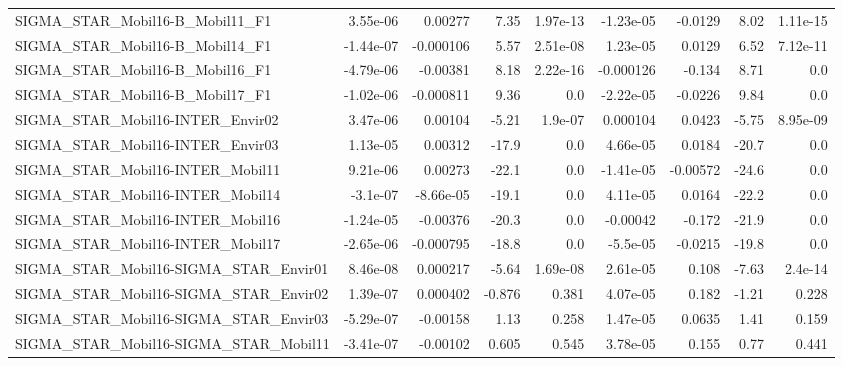 \begin{tabular}{lrrrrrrrr}
SIGMA\_STAR\_Mobil16-B\_Mobil11\_F1           &    3.55e-06 &      0.00277 &    7.35 & 1.97e-13 &  -1.23e-05 &     -0.0129 &         8.02 &      1.11e-15 \\
SIGMA\_STAR\_Mobil16-B\_Mobil14\_F1           &   -1.44e-07 &    -0.000106 &    5.57 & 2.51e-08 &   1.23e-05 &      0.0129 &         6.52 &      7.12e-11 \\
SIGMA\_STAR\_Mobil16-B\_Mobil16\_F1           &   -4.79e-06 &     -0.00381 &    8.18 & 2.22e-16 &  -0.000126 &      -0.134 &         8.71 &           0.0 \\
SIGMA\_STAR\_Mobil16-B\_Mobil17\_F1           &   -1.02e-06 &    -0.000811 &    9.36 &      0.0 &  -2.22e-05 &     -0.0226 &         9.84 &           0.0 \\
SIGMA\_STAR\_Mobil16-INTER\_Envir02          &    3.47e-06 &      0.00104 &   -5.21 &  1.9e-07 &   0.000104 &      0.0423 &        -5.75 &      8.95e-09 \\
SIGMA\_STAR\_Mobil16-INTER\_Envir03          &    1.13e-05 &      0.00312 &   -17.9 &      0.0 &   4.66e-05 &      0.0184 &        -20.7 &           0.0 \\
SIGMA\_STAR\_Mobil16-INTER\_Mobil11          &    9.21e-06 &      0.00273 &   -22.1 &      0.0 &  -1.41e-05 &    -0.00572 &        -24.6 &           0.0 \\
SIGMA\_STAR\_Mobil16-INTER\_Mobil14          &    -3.1e-07 &    -8.66e-05 &   -19.1 &      0.0 &   4.11e-05 &      0.0164 &        -22.2 &           0.0 \\
SIGMA\_STAR\_Mobil16-INTER\_Mobil16          &   -1.24e-05 &     -0.00376 &   -20.3 &      0.0 &   -0.00042 &      -0.172 &        -21.9 &           0.0 \\
SIGMA\_STAR\_Mobil16-INTER\_Mobil17          &   -2.65e-06 &    -0.000795 &   -18.8 &      0.0 &   -5.5e-05 &     -0.0215 &        -19.8 &           0.0 \\
SIGMA\_STAR\_Mobil16-SIGMA\_STAR\_Envir01     &    8.46e-08 &     0.000217 &   -5.64 & 1.69e-08 &   2.61e-05 &       0.108 &        -7.63 &       2.4e-14 \\
SIGMA\_STAR\_Mobil16-SIGMA\_STAR\_Envir02     &    1.39e-07 &     0.000402 &  -0.876 &    0.381 &   4.07e-05 &       0.182 &        -1.21 &         0.228 \\
SIGMA\_STAR\_Mobil16-SIGMA\_STAR\_Envir03     &   -5.29e-07 &     -0.00158 &    1.13 &    0.258 &   1.47e-05 &      0.0635 &         1.41 &         0.159 \\
SIGMA\_STAR\_Mobil16-SIGMA\_STAR\_Mobil11     &   -3.41e-07 &     -0.00102 &   0.605 &    0.545 &   3.78e-05 &       0.155 &         0.77 &         0.441 \\

\end{tabular}
